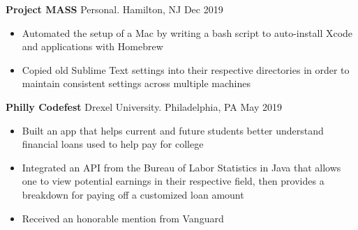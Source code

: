 \documentclass[10pt]{article}
\newcommand{\resumesection}[1]{\vspace{-0.2cm}\section*{#1}\vspace{-0.2cm}\hrule\vspace{0.2cm}}
\begin{document}
\textbf{Project MASS} Personal. Hamilton, NJ \hfill Dec 2019\par
\begin{itemize}
	\item Automated the setup of a Mac by writing a bash script to auto-install Xcode and applications with Homebrew
	\item Copied old Sublime Text settings into their respective directories in order to maintain consistent settings across multiple machines
\end{itemize}

\textbf{Philly Codefest} Drexel University. Philadelphia, PA \hfill May 2019\par
\begin{itemize}
	\item Built an app that helps current and future students better understand financial loans used to help pay for college
	\item Integrated an API from the Bureau of Labor Statistics in Java that allows one to view potential earnings in their respective field, then provides a breakdown for paying off a customized loan amount
	\item Received an honorable mention from Vanguard
\end{itemize}




%
%
\end{document}
